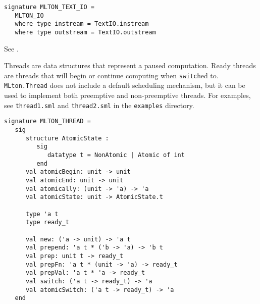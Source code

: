 \begin{verbatim}
signature MLTON_TEXT_IO =
   MLTON_IO
   where type instream = TextIO.instream
   where type outstream = TextIO.outstream
\end{verbatim}

See .

Threads are data structures that represent a paused computation.
Ready threads are threads that will begin or continue computing when
{\tt switch}ed to.  {\tt MLton.Thread} does not include a default
scheduling mechanism, but it can be used to implement both preemptive
and non-preemptive threads.  For examples, see {\tt thread1.sml} and
{\tt thread2.sml} in the {\tt examples} directory.
\begin{verbatim}
signature MLTON_THREAD =
   sig
      structure AtomicState :
         sig
            datatype t = NonAtomic | Atomic of int
         end
      val atomicBegin: unit -> unit
      val atomicEnd: unit -> unit
      val atomically: (unit -> 'a) -> 'a
      val atomicState: unit -> AtomicState.t

      type 'a t
      type ready_t

      val new: ('a -> unit) -> 'a t
      val prepend: 'a t * ('b -> 'a) -> 'b t
      val prep: unit t -> ready_t
      val prepFn: 'a t * (unit -> 'a) -> ready_t
      val prepVal: 'a t * 'a -> ready_t
      val switch: ('a t -> ready_t) -> 'a
      val atomicSwitch: ('a t -> ready_t) -> 'a
   end
\end{verbatim}

